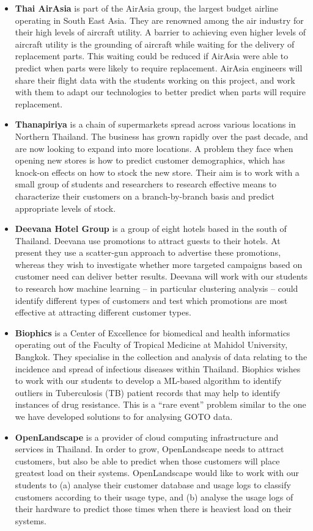 \documentclass[11pt]{article}
\begin{document}
  \begin{itemize}[leftmargin=6mm,itemsep=-3pt,topsep=1pt]
    \item {\bf Thai AirAsia} is part of the AirAsia group, the largest budget airline operating in South East Asia. They are renowned among the air industry for their high levels of aircraft utility. A barrier to achieving even higher levels of aircraft utility is the grounding of aircraft while waiting for the delivery of replacement parts. This waiting could be reduced if AirAsia were able to predict when parts were likely to require replacement. AirAsia engineers will share their flight data with the students working on this project, and work with them to adapt our technologies to better predict when parts will require replacement.
    \item {\bf Thanapiriya} is a chain of supermarkets spread across various locations in Northern Thailand. The business has grown rapidly over the past decade, and are now looking to expand into more locations. A problem they face when opening new stores is how to predict customer demographics, which has knock-on effects on how to stock the new store. Their aim is to work with a small group of students and researchers to research effective means to characterize their customers on a branch-by-branch basis and predict appropriate levels of stock.
    \item {\bf Deevana Hotel Group} is a group of eight hotels based in the south of Thailand. Deevana use promotions to attract guests to their hotels. At present they use a scatter-gun approach to advertise these promotions, whereas they wish to investigate whether more targeted campaigns based on customer need can deliver better results. Deevana will work with our students to research how machine learning -- in particular clustering analysis -- could identify different types of customers and test which promotions are most effective at attracting different customer types.
    \item {\bf Biophics} is a Center of Excellence for biomedical and health informatics operating out of the Faculty of Tropical Medicine at Mahidol University, Bangkok. They specialise in the collection and analysis of data relating to the incidence and spread of infectious diseases within Thailand. Biophics wishes to work with our students to develop a ML-based algorithm to identify outliers in Tuberculosis (TB) patient records that may help to identify instances of drug resistance. This is a ``rare event'' problem similar to the one we have developed solutions to for analysing GOTO data.
    \item {\bf OpenLandscape} is a provider of cloud computing infrastructure and services in Thailand. In order to grow, OpenLandscape needs to attract customers, but also be able to predict when those customers will place greatest load on their systems. OpenLandscape would like to work with our students to (a) analyse their customer database and usage logs to classify customers according to their usage type, and (b) analyse the usage logs of their hardware to predict those times when there is heaviest load on their systems.
  \end{itemize}
\end{document}
